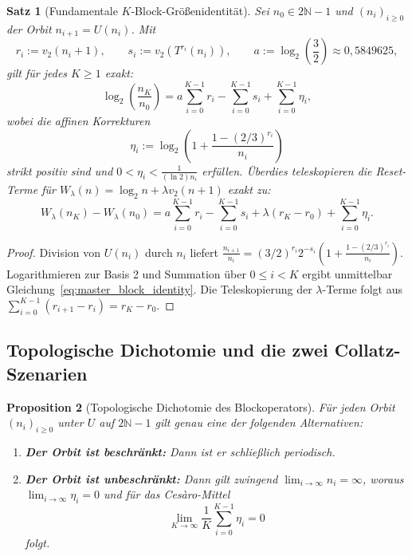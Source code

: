 \documentclass[11pt,reqno]{amsart}
\newtheorem{theorem}{Satz}[section]
\newtheorem{proposition}[theorem]{Proposition}
\theoremstyle{definition}
\theoremstyle{remark}
\numberwithin{equation}{section}
\begin{document}
\begin{theorem}[Fundamentale $K$-Block-Größenidentität]
\label{thm:block_size_identity}
Sei $n_0 \in 2\mathbb{N}-1$ und $(n_i)_{i \ge 0}$ der Orbit $n_{i+1} = U(n_i)$. Mit
\begin{equation}
r_i := v_2(n_i + 1), \qquad s_i := v_2(T^{r_i}(n_i)), \qquad a := \log_2\left(\frac{3}{2}\right) \approx 0{,}5849625,
\end{equation}
gilt für jedes $K \ge 1$ exakt:
\begin{equation}
\log_2\left(\frac{n_K}{n_0}\right) = a \sum_{i=0}^{K-1} r_i - \sum_{i=0}^{K-1} s_i + \sum_{i=0}^{K-1} \eta_i,
\label{eq:master_block_identity}
\end{equation}
wobei die affinen Korrekturen
\begin{equation}
\eta_i := \log_2\left( 1 + \frac{1 - (2/3)^{r_i}}{n_i} \right)
\end{equation}
strikt positiv sind und $0 < \eta_i < \frac{1}{(\ln 2) n_i}$ erfüllen. 
Überdies teleskopieren die Reset-Terme für $W_\lambda(n) = \log_2 n + \lambda v_2(n+1)$ exakt zu:
\begin{equation}
W_\lambda(n_K) - W_\lambda(n_0) = a \sum_{i=0}^{K-1} r_i - \sum_{i=0}^{K-1} s_i + \lambda(r_K - r_0) + \sum_{i=0}^{K-1} \eta_i.
\end{equation}
\end{theorem}

\begin{proof}
Division von $U(n_i)$ durch $n_i$ liefert $\frac{n_{i+1}}{n_i} = (3/2)^{r_i} 2^{-s_i} (1 + \frac{1-(2/3)^{r_i}}{n_i})$. Logarithmieren zur Basis 2 und Summation über $0 \le i < K$ ergibt unmittelbar Gleichung~\eqref{eq:master_block_identity}. Die Teleskopierung der $\lambda$-Terme folgt aus $\sum_{i=0}^{K-1} (r_{i+1} - r_i) = r_K - r_0$.
\end{proof}

\subsection{Topologische Dichotomie und die zwei Collatz-Szenarien}

\begin{proposition}[Topologische Dichotomie des Blockoperators]
\label{prop:block_dichotomy}
Für jeden Orbit $(n_i)_{i \ge 0}$ unter $U$ auf $2\mathbb{N}-1$ gilt genau eine der folgenden Alternativen:
\begin{enumerate}
\item \textbf{Der Orbit ist beschränkt:} Dann ist er schließlich periodisch.
\item \textbf{Der Orbit ist unbeschränkt:} Dann gilt zwingend $\lim_{i \to \infty} n_i = \infty$, woraus $\lim_{i \to \infty} \eta_i = 0$ und für das Cesàro-Mittel
\begin{equation}
\lim_{K \to \infty} \frac{1}{K} \sum_{i=0}^{K-1} \eta_i = 0
\end{equation}
folgt.
\end{enumerate}
\end{proposition}
\end{document}
